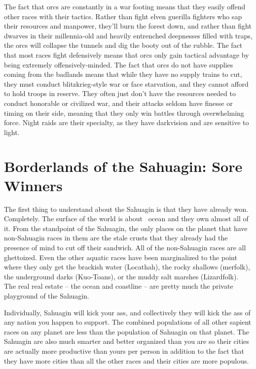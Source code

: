 The fact that orcs are constantly in a war footing means that they easily offend other races with their tactics. Rather than fight elven guerilla fighters who sap their resources and manpower, they'll burn the forest down, and rather than fight dwarves in their millennia-old and heavily entrenched deepnesses filled with traps, the orcs will collapse the tunnels and dig the booty out of the rubble. The fact that most races fight defensively means that orcs only gain tactical advantage by being extremely offensively-minded. The fact that orcs do not have supplies coming from the badlands means that while they have no supply trains to cut, they must conduct blitzkrieg-style war or face starvation, and they cannot afford to hold troops in reserve. They often just don't have the resources needed to conduct honorable or civilized war, and their attacks seldom have finesse or timing on their side, meaning that they only win battles through overwhelming force. Night raids are their specialty, as they have darkvision and are sensitive to light.

\section{Borderlands of the Sahuagin: Sore Winners}

The first thing to understand about the Sahuagin is that they have already won. Completely. The surface of the world is about \  ocean and they own almost all of it. From the standpoint of the Sahuagin, the only places on the planet that have non-Sahuagin races in them are the stale crusts that they already had the presence of mind to cut off their sandwich. All of the non-Sahuagin races are all ghettoized. Even the other aquatic races have been marginalized to the point where they only get the brackish water (Locathah), the rocky shallows (merfolk), the underground darks (Kuo-Toans), or the muddy salt marshes (Lizardfolk). The real real estate -- the ocean and coastline -- are pretty much the private playground of the Sahuagin.

Individually, Sahuagin will kick your ass, and collectively they will kick the ass of any nation you happen to support. The combined populations of all other sapient races on any planet are less than the population of Sahuagin on that planet. The Sahuagin are also much smarter and better organized than you are so their cities are actually more productive than yours per person in addition to the fact that they have more cities than all the other races and their cities are more populous.

